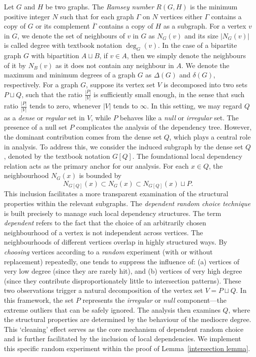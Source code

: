 \documentclass[reqno,10pt]{amsart}
\theoremstyle{definition}
\begin{document}
Let $G$ and $H$ be two graphs. The \emph{Ramsey number} $R(G, H)$ is the minimum positive integer $N$ such that for each graph $\Gamma$ on $N$ vertices either $\Gamma$ contains a copy of $G$ or its complement $\overline{\Gamma}$ contains a copy of $H$ as a subgraph. For a vertex $v$ in $G$, we denote the set of neighbours of $v$ in $G$ as $N_{G}(v)$ and its size $|N_{G}(v)|$ is called degree with textbook notation $\deg_{G}(v)$. In the case of a bipartite graph $G$ with bipartition $A\sqcup B$, if $v\in A$, then we simply denote the neighbours of it by $N_{B}(v)$ as it does not contain any neighbour in $A$. We denote the maximum and minimum degrees of a graph $G$ as $\Delta(G)$ and $\delta(G)$, respectively.
For a graph $G$, suppose its vertex set $V$ is decomposed into two sets $P\sqcup Q$, such that the ratio $\frac{|P|}{|V|}$ is sufficiently small enough, in the sense that such ratio $\frac{|P|}{|V|}$ tends to zero, whenever $|V|$ tends to $\infty$. In this setting, we may regard $Q$ as a \emph{dense} or \emph{regular} set in $V$, while $P$ behaves like a \emph{null} or \emph{irregular} set. The presence of a null set $P$ complicates the analysis of the dependency tree. However, the dominant contribution comes from the dense set $Q$, which plays a central role in analysis. To address this, we consider the induced subgraph by the dense set $Q$, denoted by the textbook notation $G[Q]$. The foundational local dependency relation acts as the primary anchor for our analysis. For each $x\in Q$, the neighbourhood $N_{G}(x)$ is bounded by  
\begin{equation}\label{nbd dependency}
N_{G[Q]}(x)\subset N_{G}(x)\subset N_{G[Q]}(x)\sqcup P.
\end{equation}
This inclusion facilitates a more transparent examination of the structural properties within the relevant subgraphs. The \emph{dependent random choice technique} is built precisely to manage such local dependency structures. The term \emph{dependent} refers to the fact that the choice of an arbitrarily chosen neighbourhood of a vertex is not independent across vertices. The neighbourhoods of different vertices overlap in highly structured ways. By \emph{choosing} vertices according to a \emph{random} experiment (with or without replacement) repeatedly, one tends to suppress the influence of: (a) vertices of very low degree (since they are rarely hit), and (b) vertices of very high degree (since they contribute disproportionately little to intersection patterns). These two observations trigger a natural decomposition of the vertex set $V=P\sqcup Q$. In this framework, the set $P$ represents the \emph{irregular} or \emph{null} component—the extreme outliers that can be safely ignored. The analysis then examines $Q$, where the structural properties are determined by the behaviour of the mediocre degree. This `cleaning' effect serves as the core mechanism of dependent random choice and is further facilitated by the inclusion of local dependencies. We implement this specific random experiment within the proof of Lemma~\ref{intersection lemma}.
\end{document}
